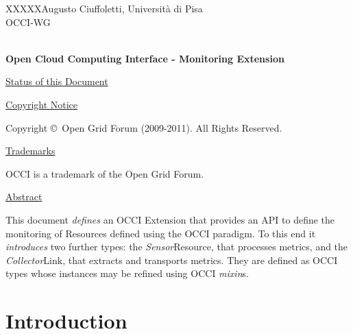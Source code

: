 \documentclass[10pt,a4paper]{article}
\newcommand{\doccode}{XXXXX}
\begin{document}
\thispagestyle{empty}

\doccode \hfill Augusto Ciuffoletti, Università di Pisa\\ 
OCCI-WG\\
\\

\vspace*{0.5in}

\begin{Large}
\textbf{Open Cloud Computing Interface - Monitoring Extension}
\end{Large}

\vspace*{0.5in}

\newcommand{\rem}[2]{}

\newcommand{\oc}[0]{\tt OCCI}
\newcommand{\mi}[0]{{\em mixin}}
\newcommand{\metr}[0]{{\em metric}}
\newcommand{\aggr}[0]{{\em aggregator}}
\newcommand{\publ}[0]{{\em publisher}}
\newcommand{\ent}[0]{{\em Entity}}
\newcommand{\rs}[0]{{\em Resource}}
\renewcommand{\ln}[0]{{\em Link}}
\newcommand{\sens}[0]{{\em Sensor}}
\newcommand{\comp}[0]{{\em Compute}}
\newcommand{\coll}[0]{{\em Collector}}

\underline{Status of this Document}


\underline{Copyright Notice}

Copyright \copyright ~Open Grid Forum (2009-2011). All Rights Reserved.

\underline{Trademarks}

OCCI is a trademark of the Open Grid Forum.

\underline{Abstract}

This document {\em defines} an OCCI Extension that provides an API to define the monitoring of Resources defined using the OCCI paradigm. To this end it {\em introduces} two further types: the \sens Resource, that processes metrics, and the \coll Link, that extracts and transports metrics. They are defined as OCCI types whose instances may be refined using OCCI \mi s.

\newpage
\tableofcontents
\newpage

\section{Introduction}
\end{document}
